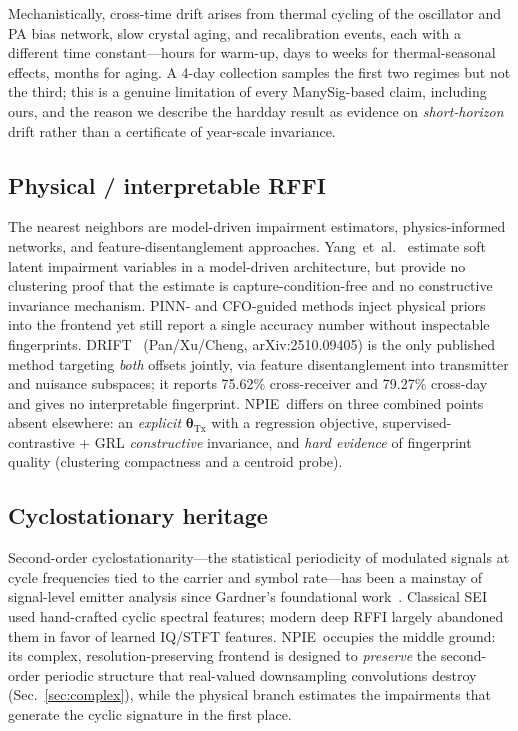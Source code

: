 \documentclass[journal]{IEEEtran}
\newcommand{\npie}{\textsc{NPIE}}
\newcommand{\tx}{\boldsymbol{\theta}_{\mathrm{Tx}}}
\begin{document}
Mechanistically, cross-time drift arises from thermal cycling of the oscillator and PA bias network, slow crystal aging, and recalibration events, each with a different time constant---hours for warm-up, days to weeks for thermal-seasonal effects, months for aging. A 4-day collection samples the first two regimes but not the third; this is a genuine limitation of every ManySig-based claim, including ours, and the reason we describe the hardday result as evidence on \emph{short-horizon} drift rather than a certificate of year-scale invariance.

\subsection{Physical / interpretable RFFI}
The nearest neighbors are model-driven impairment estimators, physics-informed networks, and feature-disentanglement approaches. Yang~et~al.~\cite{yang2026} estimate soft latent impairment variables in a model-driven architecture, but provide no clustering proof that the estimate is capture-condition-free and no constructive invariance mechanism. PINN- and CFO-guided methods inject physical priors into the frontend yet still report a single accuracy number without inspectable fingerprints. DRIFT~\cite{drift} (Pan/Xu/Cheng, arXiv:2510.09405) is the only published method targeting \emph{both} offsets jointly, via feature disentanglement into transmitter and nuisance subspaces; it reports 75.62\% cross-receiver and 79.27\% cross-day and gives no interpretable fingerprint. \npie\ differs on three combined points absent elsewhere: an \emph{explicit} $\tx$ with a regression objective, supervised-contrastive + GRL \emph{constructive} invariance, and \emph{hard evidence} of fingerprint quality (clustering compactness and a centroid probe).

\subsection{Cyclostationary heritage}
Second-order cyclostationarity---the statistical periodicity of modulated signals at cycle frequencies tied to the carrier and symbol rate---has been a mainstay of signal-level emitter analysis since Gardner's foundational work~\cite{gardner1988}. Classical SEI used hand-crafted cyclic spectral features; modern deep RFFI largely abandoned them in favor of learned IQ/STFT features. \npie\ occupies the middle ground: its complex, resolution-preserving frontend is designed to \emph{preserve} the second-order periodic structure that real-valued downsampling convolutions destroy (Sec.~\ref{sec:complex}), while the physical branch estimates the impairments that generate the cyclic signature in the first place.
\end{document}
